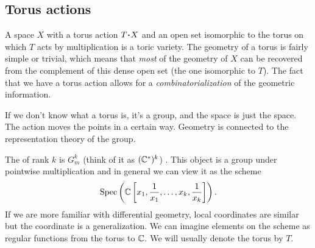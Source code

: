 \documentclass[12pt]{memoir}
\begin{document}
\subsection{Torus actions}

A space $X$ with a torus action $T\.X$ and an open set isomorphic to the torus on which $T$ acts by multiplication is a toric variety. The geometry of a torus is fairly simple or trivial, which means that \emph{most} of the geometry of $X$ can be recovered from the complement of this dense open set (the one isomorphic to $T$). The fact that we have a torus action allows for a \emph{combinatorialization} of the geometric information.\par 
If we don't know what a torus is, it's a group, and the space is just the space. The action moves the points in a certain way. Geometry is connected to the representation theory of the group.

\begin{Def}
    The  of rank $k$ is $G_m^k$ (think of it as $(\mathbb{C}^\ast)^k$) . This object is a group under pointwise multiplication and in general we can view it as the scheme 
    $$\operatorname{Spec}\left(\mathbb{C}\left\lbrack x_1,\frac{1}{x_1},\dots,x_k,\frac{1}{x_k}\right\rbrack\right).$$
    If we are more familiar with differential geometry, local coordinates are similar but the coordinate is a generalization. We can imagine elements on the scheme as regular functions from the torus to $\mathbb{C}$. We will usually denote the torus by $T$.
\end{Def}
\end{document}
